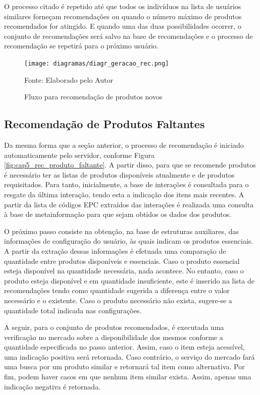 O processo citado é repetido até que todos os indivíduos na lista de usuários similares forneçam recomendações ou quando o número máximo de produtos recomendados for atingido. E quando uma das duas possibilidades ocorrer, o conjunto de recomendações será salvo na base de recomendações e o processo de recomendação se repetirá para o próximo usuário.

\begin{figure}[H]
    \caption{Fluxo para recomendação de produtos novos} 
    \label{fig:cap5_diagr_geracao_rec}
    \texttt{[image: diagramas/diagr\_geracao\_rec.png]}
    
    \footnotesize{Fonte: Elaborado pelo Autor}
\end{figure}

\subsection{Recomendação de Produtos Faltantes} \label{ssec:cap5_rec_prod_falt}

Da mesma forma que a seção anterior, o processo de recomendação é iniciado automaticamente pelo servidor, conforme Figura \ref{fig:cap5_rec_produto_faltante}. A partir disso, para que se recomende produtos é necessário ter as listas de produtos disponíveis atualmente e de produtos requisitados. Para tanto, inicialmente, a base de interações é consultada para o resgate da última interação, tendo esta a indicação dos itens mais recentes. A partir da lista de códigos EPC extraídos das interações é realizada uma consulta à base de metainformação para que sejam obtidos os dados dos produtos.

O próximo passo consiste na obtenção, na base de estruturas auxiliares, das informações de configuração do usuário, às quais indicam os produtos essenciais. A partir da extração dessas informações é efetuada uma comparação de quantidade entre produtos disponíveis e essenciais. Caso o produto essencial esteja disponível na quantidade necessária, nada acontece. No entanto, caso o produto esteja disponível e em quantidade insuficiente, este é inserido na lista de recomendações tendo como quantidade sugerida a diferença entre o valor necessário e o existente. Caso o produto necessário não exista, sugere-se a quantidade total indicada nas configurações.

A seguir, para o conjunto de produtos recomendados, é executada uma verificação no mercado sobre a disponibilidade dos mesmos conforme a quantidade especificada no passo anterior. Assim, caso o item esteja acessível, uma indicação positiva será retornada. Caso contrário, o serviço do mercado fará uma busca por um produto similar e retornará tal item como alternativa. Por fim, podem haver casos em que nenhum item similar exista. Assim, apenas uma indicação negativa é retornada.

